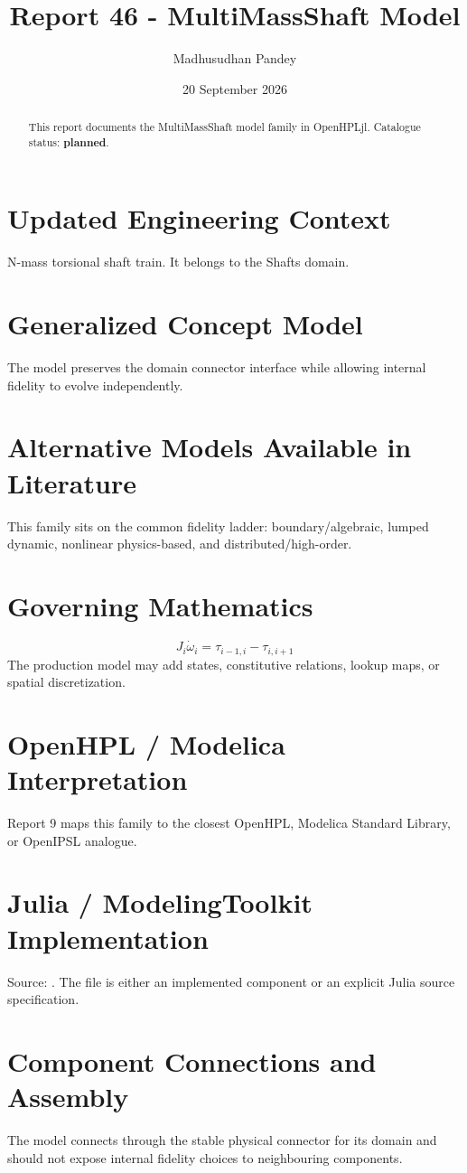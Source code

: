 \documentclass[10pt,a4paper]{article}
\title{Report 46 - MultiMassShaft Model}
\author{Madhusudhan Pandey}
\date{20 September 2026}
\begin{document}
\maketitle
\begin{abstract}This report documents the MultiMassShaft model family in OpenHPLjl. Catalogue status: \textbf{planned}.\end{abstract}
\section{Updated Engineering Context}N-mass torsional shaft train. It belongs to the Shafts domain.
\section{Generalized Concept Model}The model preserves the domain connector interface while allowing internal fidelity to evolve independently.
\section{Alternative Models Available in Literature}This family sits on the common fidelity ladder: boundary/algebraic, lumped dynamic, nonlinear physics-based, and distributed/high-order.
\section{Governing Mathematics}\[J_i\dot\omega_i=\tau_{i-1,i}-\tau_{i,i+1}\]The production model may add states, constitutive relations, lookup maps, or spatial discretization.
\section{OpenHPL / Modelica Interpretation}Report 9 maps this family to the closest OpenHPL, Modelica Standard Library, or OpenIPSL analogue.
\section{Julia / ModelingToolkit Implementation}Source: \texttt{}. The file is either an implemented component or an explicit Julia source specification.
\section{Component Connections and Assembly}The model connects through the stable physical connector for its domain and should not expose internal fidelity choices to neighbouring components.
\end{document}
